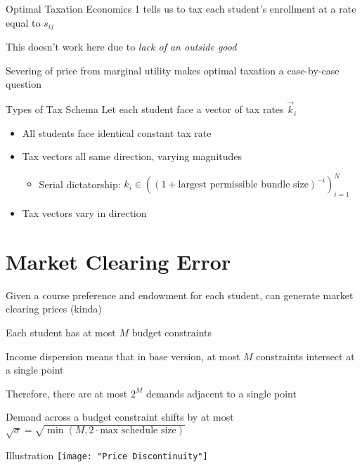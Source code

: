 \documentclass{beamer}
\begin{document}
\begin{frame}{Optimal Taxation}
Economics 1 tells us to tax each student's enrollment at a rate equal to $s_{ij}$
\pause 

This doesn't work here due to \emph{lack of an outside good}
\pause

Severing of price from marginal utility makes optimal taxation a case-by-case question
\end{frame}
\begin{frame}{Types of Tax Schema}
Let each student face a vector of tax rates $\vec{k}_i$

\begin{itemize}
    \item All students face identical constant tax rate
    \pause 
    
    \item Tax vectors all same direction, varying magnitudes \parencite{miralles2014}
    \pause 
    
    \begin{itemize}
        \item Serial dictatorship: $k_i \in \left((1 + \mbox{largest permissible bundle size})^{-i}\right)_{i = 1}^N$
    \end{itemize}
    \pause 
    
    \item Tax vectors vary in direction
\end{itemize}
\end{frame}


\section{Market Clearing Error}
\begin{frame}{\textcite{othman2010}}
Given a course preference and endowment for each student, can generate market clearing prices \pause (kinda)
\pause 

Each student has at most $M$ budget constraints 
\pause 

Income dispersion means that in base version, at most $M$ constraints intersect at a single point
\pause 

Therefore, there are at most $2^M$ demands adjacent to a single point
\pause 

Demand across a budget constraint shifts by at most $\sqrt{\sigma} = \sqrt{\min(M, 2 \cdot \mbox{max schedule size})}$
\end{frame}
\begin{frame}{\textcite{othman2010} Illustration}
    \centering
    \texttt{[image: "Price Discontinuity"]}
\end{frame}
\end{document}
